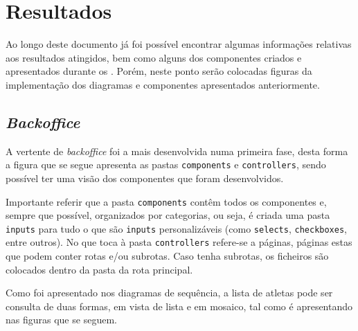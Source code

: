 \chapter{Resultados}

Ao longo deste documento já foi possível encontrar algumas informações relativas aos resultados atingidos, bem como alguns dos componentes criados e apresentados durante os . Porém, neste ponto serão colocadas figuras da implementação dos diagramas e componentes apresentados anteriormente.

\section{\textit{Backoffice}}

A vertente de \textit{backoffice} foi a mais desenvolvida numa primeira fase, desta forma a figura que se segue apresenta as pastas \texttt{components} e \texttt{controllers}, sendo possível ter uma visão dos componentes que foram desenvolvidos.

Importante referir que a pasta \texttt{components} contêm todos os componentes e, sempre que possível, organizados por categorias, ou seja, é criada uma pasta \texttt{inputs} para tudo o que são \texttt{inputs} personalizáveis (como \texttt{selects}, \texttt{checkboxes}, entre outros). No que toca à pasta \texttt{controllers} refere-se a páginas, páginas estas que podem conter rotas e/ou subrotas. Caso tenha subrotas, os ficheiros são colocados dentro da pasta da rota principal.

\clearpage

\begin{minipage}[t]{0.45\textwidth}
\end{minipage}
\begin{minipage}[t]{0.45\textwidth}
\end{minipage}

Como foi apresentado nos diagramas de sequência, a lista de atletas pode ser consulta de duas formas, em vista de lista e em mosaico, tal como é apresentando nas figuras que se seguem.

\begin{minipage}[t]{0.45\textwidth}
\end{minipage}
\begin{minipage}[t]{0.45\textwidth}
\end{minipage}

